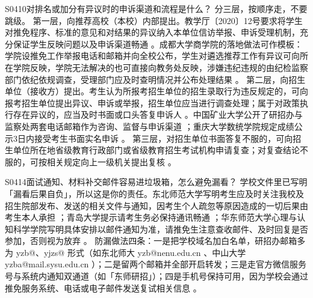 \begin{qa}{S0410}{对排名或加分有异议时的申诉渠道和流程是什么？}
分三层，按顺序走，不要跳级。
第一层，向推荐高校（本校）内部提出。教学厅〔2020〕12号要求将学生对推免程序、标准的意见和对结果的异议纳入本单位信访举报、申诉受理机制，充分保证学生反映问题以及申诉渠道畅通 。成都大学商学院的落地做法可作模板：学院设推免工作举报电话和邮箱并向全校公布，学生对遴选推荐工作有异议可向所在学院反映，学院无法解决的也可直接向教务处反映，涉嫌违纪违规的由纪检监察部门依纪依规调查，受理部门应及时查明情况并公布处理结果 。
第二层，向招生单位（接收方）提出。考生认为所报考招生单位的招生录取行为违反规定的，可向报考招生单位提出异议、申诉或举报，招生单位应当进行调查处理；属于对政策执行存在异议的，应当及时书面或口头答复申诉人 。中国矿业大学公开了研招办与监察处两套电话邮箱作为咨询、监督与申诉渠道 ；重庆大学数统学院规定成绩公示3日内接受考生书面实名申诉 。
第三层，对招生单位书面答复不服的，可向招生单位所在地省级教育行政部门或省级教育招生考试机构申请复查；对复查结论不服的，可按相关规定向上一级机关提出复核 。
\end{qa}

\begin{qa}{S0414}{面试通知、材料补交邮件容易进垃圾箱，怎么避免漏看？}
学校文件里已写明「漏看后果自负」，所以这是你的责任。东北师范大学写明考生应及时关注我校及招生院部发布、发送的相关文件与通知，因考生个人疏忽等原因造成的一切后果由考生本人承担 ；青岛大学提示请考生务必保持通讯畅通 ；华东师范大学心理与认知科学学院写明具体安排以邮件通知为准，请推免生注意查收邮件、及时回复是否参加，否则视为放弃 。
防漏做法四条：一是把学校域名加白名单，研招办邮箱多为 yzb@、yjzs@ 形式（如东北师大 yzb@nenu.edu.cn 、中山大学 yzba@mail.sysu.edu.cn ）；二是留两个邮箱并全部开启转发；三是走官方微信服务号与系统内通知双通道（如「东师研招」）；四是手机号保持可用，因为学校会通过推免服务系统、电话或电子邮件发送复试相关信息 。
\end{qa}

